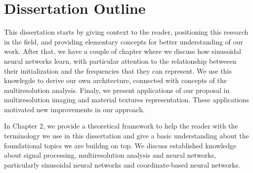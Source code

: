 


\section{Dissertation Outline}

This dissertation starts by giving context to the reader, positioning this research in the field, and providing elementary concepts for better understanding of our work. After that, we have a couple of chapter where we discuss how sinusoidal neural networks learn, with particular attention to the relationship betweeen their initialization and the frequencies that they can represent. We use this knowlegde to derive our own architecture, connected with concepts of the multiresolution analysis. Finaly, we present applications of our proposal in multiresolution imaging and material textures representation. These applications motivated new improvements in our approach. 

In Chapter 2, we provide a theoretical framework to help the reader with the terminology we use in this dissertation and give a basic understanding about the foundational topics we are buildng on top. We discuss established knowledge about signal processing, multiresolution analysis and neural networks, particularly sinusoidal neural networks and coordinate-based neural networks.

